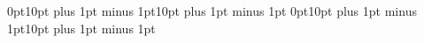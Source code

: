 \documentclass[titlesmallcaps,%
               examinerscopy,%
               copyrightpage]{uqthesis}
\begin{document}
\frontmatter
\listoftodos


\mainmatter
\setlength{\parskip}{20pt} %

\renewcommand{\baselinestretch}{1.5}\normalsize

\titlespacing*{\section}
{0pt}{10pt plus 1pt minus 1pt}{10pt plus 1pt minus 1pt}
\titlespacing*{\subsection}
{0pt}{10pt plus 1pt minus 1pt}{10pt plus 1pt minus 1pt}
\renewcommand*{\chapterheadendvskip}{%
  \vspace{0.725\baselineskip plus 0.115\baselineskip minus 0.192\baselineskip}%
}

\renewcommand*{\chapterheadstartvskip}{\vspace*{\baselineskip}}









\appendix
 
\backmatter



\end{document}
